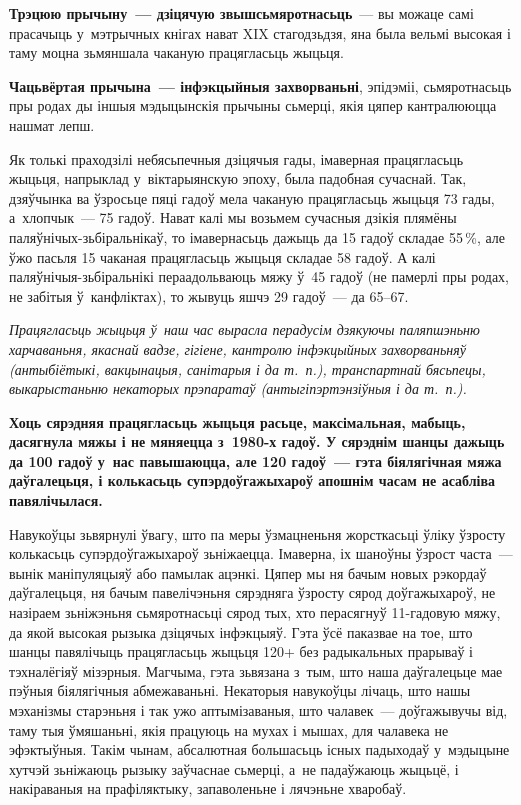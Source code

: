\textbf{Трэцюю прычыну~--- дзіцячую звышсьмяротнасьць}~--- вы можаце самі прасачыць у~мэтрычных кнігах нават XIX стагодзьдзя, яна была вельмі высокая і таму моцна зьмяншала чаканую працягласьць жыцьця. 

\textbf{Чацьвёртая прычына~--- інфэкцыйныя захворваньні}, эпідэміі, сьмяротнасьць пры родах ды іншыя мэдыцынскія прычыны сьмерці, якія цяпер кантралююцца нашмат лепш.

Як толькі праходзілі небясьпечныя дзіцячыя гады, імаверная працягласьць жыцьця, напрыклад у~віктарыянскую эпоху, была падобная сучаснай. Так, дзяўчынка ва ўзросьце пяці гадоў мела чаканую працягласьць жыцьця 73 гады, а~хлопчык~--- 75 гадоў. Нават калі мы возьмем сучасныя дзікія плямёны паляўнічых-зьбіральнікаў, то імавернасьць дажыць да 15 гадоў складае 55\,\%, але ўжо пасьля 15 чаканая працягласьць жыцьця складае 58 гадоў. А калі паляўнічыя-зьбіральнікі пераадольваюць мяжу ў~45 гадоў (не памерлі пры родах, не забітыя ў~канфліктах), то жывуць яшчэ 29 гадоў~--- да 65--67.

\emph{Працягласьць жыцьця ў~наш час вырасла перадусім дзякуючы паляпшэньню харчаваньня, якаснай вадзе, гігіене, кантролю інфэкцыйных захворваньняў (антыбіётыкі, вакцынацыя, санітарыя і да т.~п.), транспартнай бясьпецы, выкарыстаньню некаторых прэпаратаў (антыгіпэртэнзіўныя і да т.~п.).}

\textbf{Хоць сярэдняя працягласьць жыцьця расьце, максімальная, мабыць, дасягнула мяжы і не мяняецца з~1980-х гадоў. У сярэднім шанцы дажыць да 100 гадоў у~нас павышаюцца, але 120 гадоў~--- гэта біялягічная мяжа даўгалецьця, і колькасьць супэрдоўгажыхароў апошнім часам не асабліва павялічылася.}

Навукоўцы зьвярнулі ўвагу, што па меры ўзмацненьня жорсткасьці ўліку ўзросту колькасьць супэрдоўгажыхароў зьніжаецца. Імаверна, іх шаноўны ўзрост часта~--- вынік маніпуляцыяў або памылак ацэнкі. Цяпер мы ня бачым новых рэкордаў даўгалецьця, ня бачым павелічэньня сярэдняга ўзросту сярод доўгажыхароў, не назіраем зьніжэньня сьмяротнасьці сярод тых, хто перасягнуў 11-гадовую мяжу, да якой высокая рызыка дзіцячых інфэкцыяў. Гэта ўсё паказвае на тое, што шанцы павялічыць працягласьць жыцьця 120+ без радыкальных прарываў і тэхналёгіяў мізэрныя. Магчыма, гэта зьвязана з~тым, што наша даўгалецьце мае пэўныя біялягічныя абмежаваньні. Некаторыя навукоўцы лічаць, што нашы мэханізмы старэньня і так ужо аптымізаваныя, што чалавек~--- доўгажывучы від, таму тыя ўмяшаньні, якія працуюць на мухах і мышах, для чалавека не эфэктыўныя. Такім чынам, абсалютная большасьць існых падыходаў у~мэдыцыне хутчэй зьніжаюць рызыку заўчаснае сьмерці, а~не падаўжаюць жыцьцё, і накіраваныя на прафіляктыку, запаволеньне і лячэньне хваробаў.

